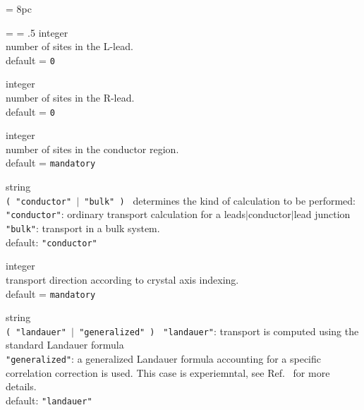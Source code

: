 \newdimen\descindent \descindent = 8pc
{\noindent \leftskip = \descindent \parskip = .5\baselineskip
{}%
{\sc integer} \\ number of sites in the L-lead.
\\ {\sc default} = {\tt 0} \par

\noindent{}%
{\sc integer} \\ number of sites in the R-lead. \\ 
{\sc default} = {\tt 0} \par

\noindent{}%
{\sc integer} \\ number of sites in the conductor region. \\ 
{\sc default} = {\tt mandatory} \par

\noindent{}%
{\sc string} \\ {\tt ( "conductor" $\mid$ "bulk" ) }
            determines the kind of calculation to be performed:\\
            {\tt "conductor"}:  ordinary transport calculation for a 
                    leads$\mid$conductor$\mid$lead junction\\
            {\tt "bulk"}: transport in a bulk system.\\
            {\sc default}: {\tt "conductor"} \par

\noindent{}%
{\sc integer} \\ transport direction according to crystal axis indexing. \\
{\sc default} = {\tt mandatory} \par

\noindent{}%
{\sc string} \\ {\tt ( "landauer" $\mid$ "generalized" ) }
            {\tt "landauer"}:  transport is computed using the standard Landauer formula \\
            {\tt "generalized"}: a generalized Landauer formula accounting for a 
                 specific correlation correction is used. This case is experiemntal, see
                 Ref.~\cite{ferr+05prl, ferr+05prb} for more details. \\
            {\sc default}: {\tt "landauer"} \par

}
